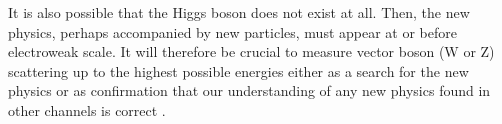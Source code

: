 It is also possible that the Higgs boson does not exist at all. %
Then, the new physics, perhaps accompanied by new particles, must appear at or before electroweak scale. It will therefore be crucial to measure vector boson (W or Z) scattering up to the highest possible energies either as a search for the new physics or as confirmation that our understanding of any new physics found in other channels is correct \cite{phdThesis:Bruno}.


